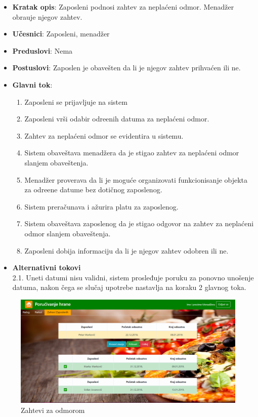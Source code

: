  \begin{itemize}
    \item \textbf{Kratak opis}:
  Zaposleni podnosi zahtev za nepla\'ceni odmor. Menad\v zer obra\dj uje njegov zahtev.
    \item \textbf{Učesnici}:
    Zaposleni, menad\v zer
    \item \textbf{Preduslovi}: Nema
    \item \textbf{Postuslovi}:
    Zaposlen je obave\v sten da li je njegov zahtev prihva\'cen ili ne.
    \item \textbf{Glavni tok}:
    \begin{enumerate}
        \item Zaposleni se prijavljuje na sistem
        \item Zaposleni vr\v si odabir odre\dj enih datuma za nepla\'ceni odmor.
        \item Zahtev za nepla\'ceni odmor se evidentira u sistemu.
        \item Sistem obave\v stava menad\v zera da je stigao zahtev za nepla\'ceni odmor slanjem obaveštenja.
        \item Menad\v zer proverava da li je moguće organizovati funkcionisanje objekta za odre\dj ene datume bez dotičnog zaposlenog.
        \item Sistem prera\v cunava i a\v zurira platu za zaposlenog.
        \item Sistem obave\v stava zaposlenog da je stigao odgovor na zahtev za nepla\'ceni odmor slanjem obaveštenja.
        \item Zaposleni dobija informaciju da li je njegov zahtev odobren ili ne.
    \end{enumerate}
\item \textbf{Alternativni tokovi}\\
        2.1. Uneti datumi nisu validni, sistem prosleđuje poruku za ponovno unošenje datuma, nakon čega se slučaj upotrebe nastavlja na koraku 2 glavnog toka.

\end{itemize}
 \begin{figure}[!h]
    \includegraphics[width=1\textwidth]{slike/menadzer_zahteviZaOdmorom1.PNG}
    \caption{Zahtevi za  odmorom} %
    \label{fig:slika_odmor}
\end{figure}
